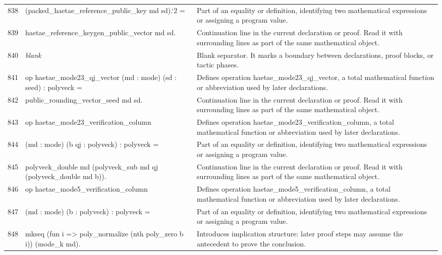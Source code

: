 \documentclass[10pt]{article}
\begin{document}
\begin{longtable}{r L{0.53\textwidth} L{0.37\textwidth}}
838 & {\ttfamily\scriptsize   (packed\_haetae\_reference\_public\_key md sd).`2 =} & Part of an equality or definition, identifying two mathematical expressions or assigning a program value. \\
839 & {\ttfamily\scriptsize     haetae\_reference\_keygen\_public\_vector md sd.} & Continuation line in the current declaration or proof.  Read it with surrounding lines as part of the same mathematical object. \\
840 & {\ttfamily\scriptsize \emph{blank}} & Blank separator.  It marks a boundary between declarations, proof blocks, or tactic phases. \\
841 & {\ttfamily\scriptsize op haetae\_mode23\_qj\_vector (md : mode) (sd : seed) : polyveck =} & Defines operation haetae\_mode23\_qj\_vector, a total mathematical function or abbreviation used by later declarations. \\
842 & {\ttfamily\scriptsize   public\_rounding\_vector\_seed md sd.} & Continuation line in the current declaration or proof.  Read it with surrounding lines as part of the same mathematical object. \\
843 & {\ttfamily\scriptsize op haetae\_mode23\_verification\_column} & Defines operation haetae\_mode23\_verification\_column, a total mathematical function or abbreviation used by later declarations. \\
844 & {\ttfamily\scriptsize    (md : mode) (b qj : polyveck) : polyveck =} & Part of an equality or definition, identifying two mathematical expressions or assigning a program value. \\
845 & {\ttfamily\scriptsize   polyveck\_double md (polyveck\_sub md qj (polyveck\_double md b)).} & Continuation line in the current declaration or proof.  Read it with surrounding lines as part of the same mathematical object. \\
846 & {\ttfamily\scriptsize op haetae\_mode5\_verification\_column} & Defines operation haetae\_mode5\_verification\_column, a total mathematical function or abbreviation used by later declarations. \\
847 & {\ttfamily\scriptsize    (md : mode) (b : polyveck) : polyveck =} & Part of an equality or definition, identifying two mathematical expressions or assigning a program value. \\
848 & {\ttfamily\scriptsize   mkseq (fun i => poly\_normalize (nth poly\_zero b i)) (mode\_k md).} & Introduces implication structure: later proof steps may assume the antecedent to prove the conclusion. \\

\end{longtable}
\end{document}
